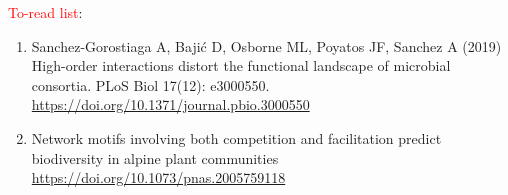 \documentclass[letterpaper, 10pt]{article}
\begin{document}
\textcolor{red}{To-read list}:
\begin{enumerate}
\item Sanchez-Gorostiaga A, Bajić D, Osborne ML, Poyatos JF, Sanchez A (2019) High-order interactions distort the functional landscape of microbial consortia. PLoS Biol 17(12): e3000550. \url{https://doi.org/10.1371/journal.pbio.3000550}
\item Network motifs involving both competition and facilitation predict biodiversity in alpine plant communities \url{https://doi.org/10.1073/pnas.2005759118}
\end{enumerate}



\end{document}
